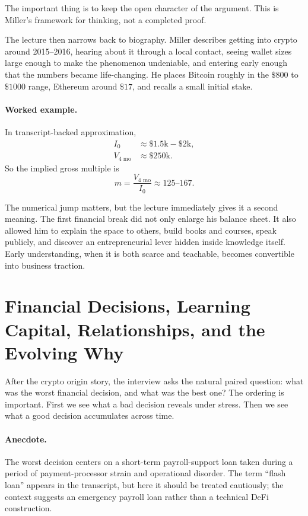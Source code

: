 The important thing is to keep the open character of the argument. This is Miller's framework for thinking, not a completed proof.

The lecture then narrows back to biography. Miller describes getting into crypto around 2015--2016, hearing about it through a local contact, seeing wallet sizes large enough to make the phenomenon undeniable, and entering early enough that the numbers became life-changing. He places Bitcoin roughly in the \(\$800\) to \(\$1000\) range, Ethereum around \(\$17\), and recalls a small initial stake.

\paragraph{Worked example.} In transcript-backed approximation,
\begin{align}
I_0 &\approx \$1.5\text{k}-\$2\text{k},\\
V_{4\text{ mo}} &\approx \$250\text{k}.
\end{align}
So the implied gross multiple is
\begin{equation}
m=\frac{V_{4\text{ mo}}}{I_0}\approx 125\text{--}167.
\end{equation}

The numerical jump matters, but the lecture immediately gives it a second meaning. The first financial break did not only enlarge his balance sheet. It also allowed him to explain the space to others, build books and courses, speak publicly, and discover an entrepreneurial lever hidden inside knowledge itself. Early understanding, when it is both scarce and teachable, becomes convertible into business traction.

\section{Financial Decisions, Learning Capital, Relationships, and the Evolving Why}

After the crypto origin story, the interview asks the natural paired question: what was the worst financial decision, and what was the best one? The ordering is important. First we see what a bad decision reveals under stress. Then we see what a good decision accumulates across time.

\paragraph{Anecdote.} The worst decision centers on a short-term payroll-support loan taken during a period of payment-processor strain and operational disorder. The term ``flash loan'' appears in the transcript, but here it should be treated cautiously; the context suggests an emergency payroll loan rather than a technical DeFi construction.

